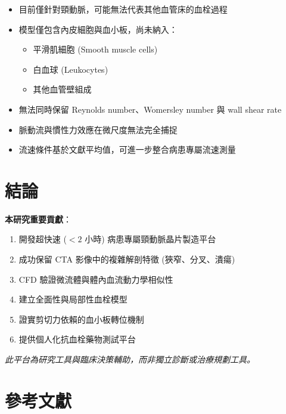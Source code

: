 \documentclass[12pt,a4paper]{article}
\begin{document}
\begin{itemize}
    \item 目前僅針對頸動脈，可能無法代表其他血管床的血栓過程
    \item 模型僅包含內皮細胞與血小板，尚未納入：
    \begin{itemize}
        \item 平滑肌細胞 (Smooth muscle cells)
        \item 白血球 (Leukocytes)
        \item 其他血管壁組成
    \end{itemize}
    \item 無法同時保留 Reynolds number、Womersley number 與 wall shear rate
    \item 脈動流與慣性力效應在微尺度無法完全捕捉
    \item 流速條件基於文獻平均值，可進一步整合病患專屬流速測量
\end{itemize}

\section{結論}

\begin{importantbox}
\textbf{本研究重要貢獻}：
\begin{enumerate}
    \item 開發超快速 ($<2$ 小時) 病患專屬頸動脈晶片製造平台
    \item 成功保留 CTA 影像中的複雜解剖特徵 (狹窄、分叉、潰瘍)
    \item CFD 驗證微流體與體內血流動力學相似性
    \item 建立全面性與局部性血栓模型
    \item 證實剪切力依賴的血小板轉位機制
    \item 提供個人化抗血栓藥物測試平台
\end{enumerate}
\end{importantbox}

\vspace{0.5cm}
\begin{center}
\textit{此平台為研究工具與臨床決策輔助，而非獨立診斷或治療規劃工具。}
\end{center}

\section{參考文獻}
\end{document}
